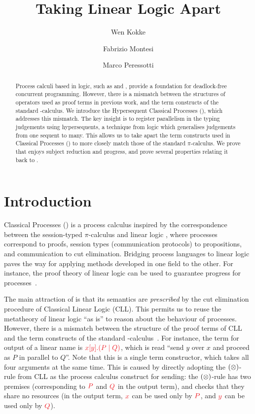 \documentclass[draft,submission,copyright,creativecommons]{eptcs}
\title{Taking Linear Logic Apart}
\author{%
  Wen Kokke
  \institute{University of Edinburgh\\ Edinburgh, Scotland}
  \email{wen.kokke@ed.ac.uk}
  \and
  Fabrizio Montesi
  \institute{University of Southern Denmark\\ Odense, Denmark}
  \email{fmontesi@imada.sdu.dk}
  \and
  Marco Peressotti
  \institute{University of Southern Denmark\\ Odense, Denmark}
  \email{peressotti@imada.sdu.dk}}
\begin{document}
\maketitle

\begin{abstract}
  Process calculi based in logic, such as \piDILL and \cp, provide a foundation
  for deadlock-free concurrent programming.
  However, there is a mismatch between the structures of operators used as proof
  terms in previous work, and the term constructs of the standard \textpi-calculus.
  We introduce the Hypersequent Classical Processes (\hcp), which addresses this
  mismatch.
  The key insight is to register parallelism in the typing judgements using
  hypersequents, a technique from logic which generalises judgements from one
  sequent to many.
  This allows us to take apart the term constructs used in Classical Processes
  (\cp) to more closely match those of the standard $\pi$-calculus.
  We prove that \hcp enjoys subject reduction and progress, and prove several
  properties relating it back to \cp.
\end{abstract}

\section{Introduction}
\label{sec:introduction}

Classical Processes (\cp) \cite{wadler2012} is a process calculus inspired by the
correspondence between the session-typed $\pi$-calculus and linear logic
\cite{caires2010}, where processes correspond to proofs, session types
(communication protocols) to propositions, and communication to cut elimination.
Bridging process languages to linear logic paves the way for applying methods
developed in one field to the other.
For instance, the proof theory of linear logic can be used to guarantee progress
for processes~\cite{caires2010,wadler2012}.

The main attraction of \cp is that its semantics are \emph{prescribed} by the
cut elimination procedure of Classical Linear Logic (CLL).
This permits us to reuse the metatheory of linear logic ``as is'' to reason about
the behaviour of processes.
However, there is a mismatch between the structure of the proof terms of CLL and
the term constructs of the standard \textpi-calculus~\cite{milner1992a,milner1992b}.
For instance, the term for output of a linear name is
$\tm{\cpSend{x}{y}{P}{Q}}$, which is read ``send $y$ over $x$ and proceed as $P$
in parallel to $Q$''.
Note that this is a single term constructor, which takes all four arguments at
the same time.
This is caused by directly adopting the $(\otimes)$-rule from CLL as the process
calculus construct for sending: the $(\otimes)$-rule has two premises (corresponding to $\tm P$ and $\tm Q$ in the output term), and checks
that they share no resources (in the output term, $\tm x$ can be used only by $\tm P$, and $\tm y$ can be used only by $\tm Q$).
\end{document}
